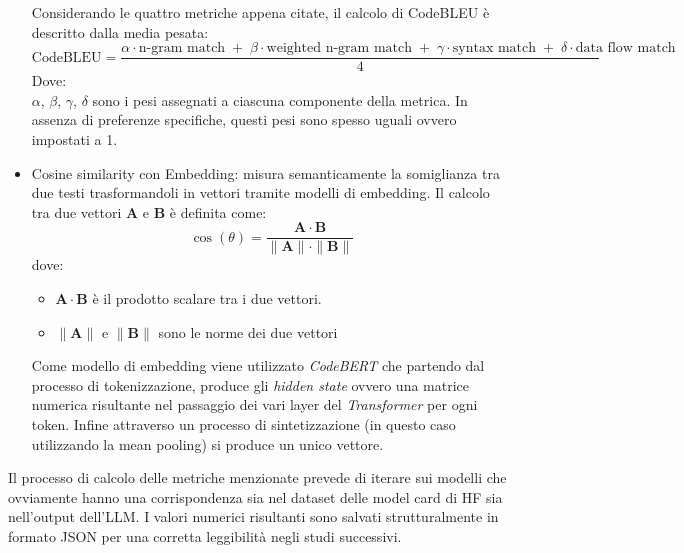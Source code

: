 \documentclass{article}
\begin{document}
\begin{itemize}
\begin{itemize}
    \end{itemize}
    Considerando le quattro metriche appena citate, il calcolo di CodeBLEU è descritto dalla media pesata:
    \begin{equation} \label{codebleu}
        \text{CodeBLEU} = \frac{\alpha \cdot \text{n-gram match} \;+\; \beta \cdot \text{weighted n-gram match} \;+\; \gamma \cdot \text{syntax match} \;+\; \delta \cdot \text{data flow match}}{4}
    \end{equation}
    Dove:\\
    $\alpha$, $\beta$, $\gamma$, $\delta$ sono i pesi assegnati a ciascuna componente della metrica. In assenza di preferenze specifiche, questi pesi sono spesso uguali ovvero impostati a 1.  
    \item Cosine similarity con Embedding: misura semanticamente la somiglianza tra due testi trasformandoli in vettori tramite modelli di embedding. Il calcolo tra due vettori $\mathbf{A}$ e $\mathbf{B}$ è definita come:
    \begin{equation}
        \cos(\theta) = \frac{\mathbf{A} \cdot \mathbf{B}}{\|\mathbf{A}\| \cdot \|\mathbf{B}\|}
    \end{equation}
    dove:
    \begin{itemize}
        \item $\mathbf{A} \cdot \mathbf{B}$ è il prodotto scalare tra i due vettori.
        \item $\|\mathbf{A}\|$ e $\|\mathbf{B}\|$ sono le norme dei due vettori
    \end{itemize}
    Come modello di embedding viene utilizzato \textit{CodeBERT} \cite{feng2020codebertpretrainedmodelprogramming} che partendo dal processo di tokenizzazione, produce gli \textit{hidden state} ovvero una matrice numerica risultante nel passaggio dei vari layer del \textit{Transformer} per ogni token. Infine attraverso un processo di sintetizzazione (in questo caso utilizzando la mean pooling) si produce un unico vettore. 
\end{itemize}
Il processo di calcolo delle metriche menzionate prevede di iterare sui modelli che ovviamente hanno una corrispondenza sia nel dataset delle model card di HF sia nell'output dell'LLM. I valori numerici risultanti sono salvati strutturalmente in formato JSON per una corretta leggibilità negli studi successivi.
\end{document}
